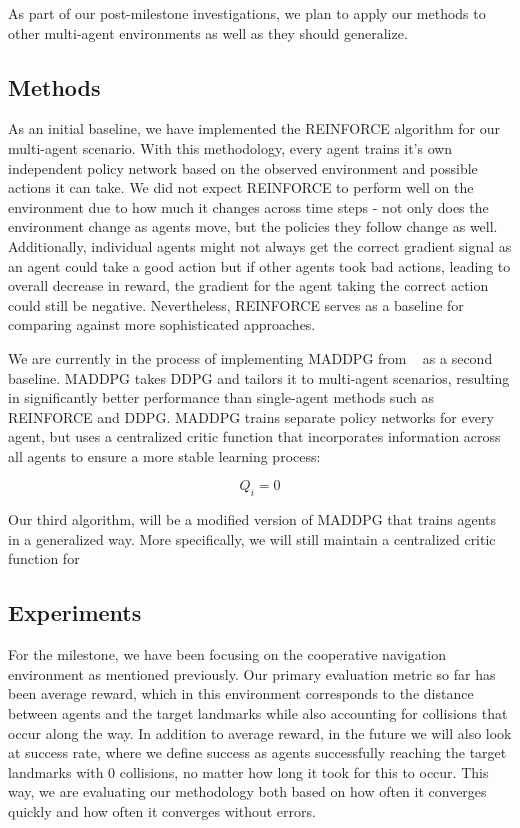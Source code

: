 \documentclass{article}
\begin{document}
As part of our post-milestone investigations, we plan to apply our methods to other multi-agent environments as well as they should generalize.

\subsection{Methods}
As an initial baseline, we have implemented the REINFORCE algorithm for our multi-agent scenario. With this methodology, every agent trains it's own independent policy network based on the observed environment and possible actions it can take. We did not expect REINFORCE to perform well on the environment due to how much it changes across time steps - not only does the environment change as agents move, but the policies they follow change as well. Additionally, individual agents might not always get the correct gradient signal as an agent could take a good action but if other agents took bad actions, leading to overall decrease in reward, the gradient for the agent taking the correct action could still be negative. Nevertheless, REINFORCE serves as a baseline for comparing against more sophisticated approaches.

We are currently in the process of implementing MADDPG from ~\cite{maddpg} as a second baseline. MADDPG takes DDPG and tailors it to multi-agent scenarios, resulting in significantly better performance than single-agent methods such as REINFORCE and DDPG. MADDPG trains separate policy networks for every agent, but uses a centralized critic function that incorporates information across all agents to ensure a more stable learning process:

$$Q_i = 0$$

Our third algorithm, will be a modified version of MADDPG that trains agents in a generalized way. More specifically, we will still maintain a centralized critic function for

\subsection{Experiments}

For the milestone, we have been focusing on the cooperative navigation environment as mentioned previously. Our primary evaluation metric so far has been average reward, which in this environment corresponds to the distance between agents and the target landmarks while also accounting for collisions that occur along the way. In addition to average reward, in the future we will also look at success rate, where we define success as agents successfully reaching the target landmarks with 0 collisions, no matter how long it took for this to occur. This way, we are evaluating our methodology both based on how often it converges quickly and how often it converges without errors.
\end{document}
